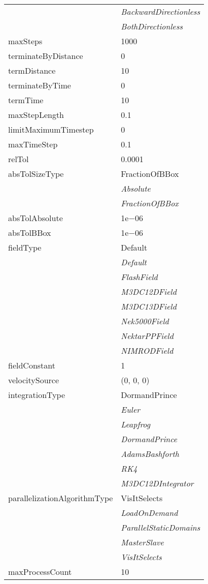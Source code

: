 \documentclass[10pt,a4paper]{report}
\begin{document}
\begin{longtable}{ll}
 & {\it  BackwardDirectionless} \\
 & {\it  BothDirectionless} \\
maxSteps  &  1000 \\
terminateByDistance  &  0 \\
termDistance  &  10 \\
terminateByTime  &  0 \\
termTime  &  10 \\
maxStepLength  &  0.1 \\
limitMaximumTimestep  &  0 \\
maxTimeStep  &  0.1 \\
relTol  &  0.0001 \\
absTolSizeType  &  FractionOfBBox   \\
 & {\it  Absolute} \\
 & {\it  FractionOfBBox} \\
absTolAbsolute  &  1e$-$06 \\
absTolBBox  &  1e$-$06 \\
fieldType  &  Default   \\
 & {\it  Default} \\
 & {\it  FlashField} \\
 & {\it  M3DC12DField} \\
 & {\it  M3DC13DField} \\
 & {\it  Nek5000Field} \\
 & {\it  NektarPPField} \\
 & {\it  NIMRODField} \\
fieldConstant  &  1 \\
velocitySource  &  (0, 0, 0) \\
integrationType  &  DormandPrince   \\
 & {\it  Euler} \\
 & {\it  Leapfrog} \\
 & {\it  DormandPrince} \\
 & {\it  AdamsBashforth} \\
 & {\it  RK4} \\
 & {\it  M3DC12DIntegrator} \\
parallelizationAlgorithmType  &  VisItSelects   \\
 & {\it  LoadOnDemand} \\
 & {\it  ParallelStaticDomains} \\
 & {\it  MasterSlave} \\
 & {\it  VisItSelects} \\
maxProcessCount  &  10 \\

\end{longtable}
\end{document}
